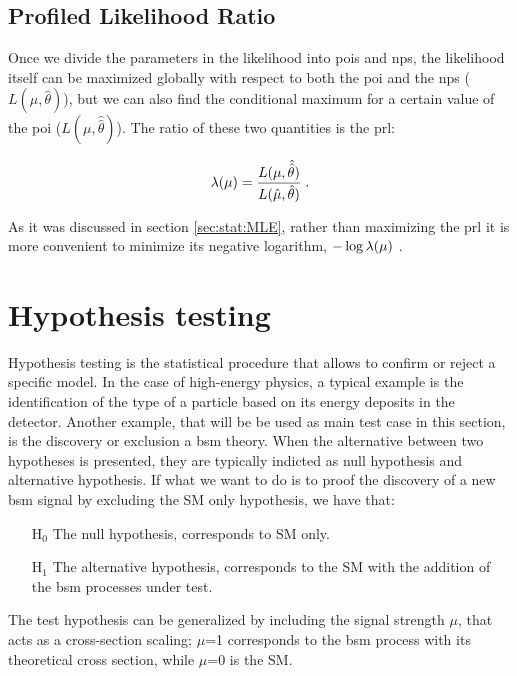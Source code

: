 \subsection{Profiled Likelihood Ratio}

Once we divide the parameters in the likelihood into \glspl{poi} and \glspl{np}, the likelihood itself can be maximized globally with respect to both the \gls{poi} and the \glspl{np} ($L(\hat{\mu}, \hat{\theta})$), but we can also find the conditional maximum for a certain value of the \gls{poi} ($L(\mu, \hat{\hat{\theta}})$). The ratio of these two quantities is the \gls{prl}:

\begin{equation}
\label{eq:stat:prl}
\lambda(\mu) = \frac{ L(\mu, \hat{\hat{\theta}}) } {L(\hat{\mu}, \hat{\theta}) } \;.
\end{equation}

\noindent As it was discussed in section \ref{sec:stat:MLE}, rather than maximizing the \gls{prl} it is more convenient to minimize its negative logarithm, $- \log{\lambda(\mu)} \ $.


\section{Hypothesis testing}
\label{sec:stat:ht}

Hypothesis testing is the statistical procedure that allows to confirm or reject a specific model. In the case of high-energy physics, a typical example is the identification of the type of a particle based on its energy deposits in the detector. Another example, that will be be used as main test case in this section, is the discovery or exclusion a \gls{bsm} theory. When the alternative between two hypotheses is presented, they are typically indicted as null hypothesis and alternative hypothesis. If what we want to do is to proof the discovery of a new \gls{bsm} signal by excluding the SM only hypothesis, we have that:

\begin{itemize}
\item[H$_0$] The null hypothesis, corresponds to SM only.
\item[H$_1$] The alternative hypothesis, corresponds to the SM with the addition of the \gls{bsm} processes under test.
\end{itemize}

\noindent The test hypothesis can be generalized by including the signal strength $\mu$, that acts as a cross-section scaling; $\mu$=1 corresponds to the \gls{bsm} process with its theoretical cross section, while $\mu$=0 is the SM.

